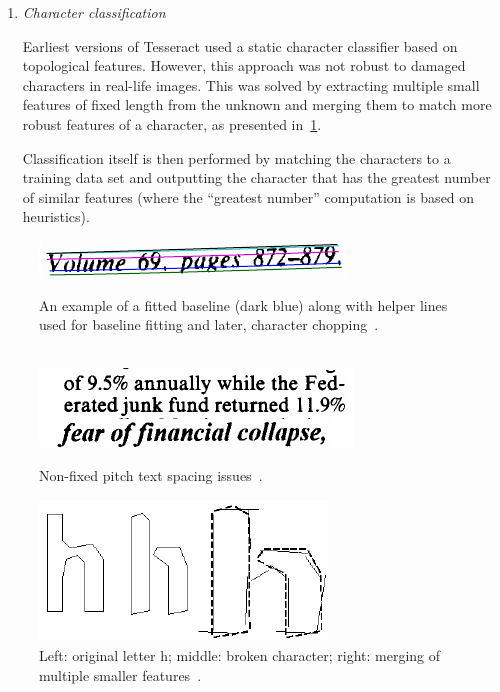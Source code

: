 \begin{enumerate}
    \item \emph{Character classification}
    
    Earliest versions of Tesseract used a static character classifier based on topological features. However, this approach was not robust to damaged characters in real-life images. This was solved by extracting multiple small features of fixed length from the unknown and merging them to match more robust features of a character, as presented in~\cref{fig:textRecTesseractChars}.
    
    Classification itself is then performed by matching the characters to a training data set and outputting the character that has the greatest number of similar features (where the ``greatest number'' computation is based on heuristics).
    
\end{enumerate}

\begin{figure}[t]
\minipage{\textwidth}
    \centering
    \includegraphics[width=0.7\linewidth]{img/textDetection/tesseractBaseline.png}
    \caption{An example of a fitted baseline (dark blue) along with helper lines used for baseline fitting and later, character chopping~\citep{smith2007overview}.}
    \label{fig:textRecTesseractBaseline}
\endminipage\\
    \includegraphics[width=\linewidth]{img/textDetection/tesseractSpacing.png}
    \caption{Non-fixed pitch text spacing issues~\citep{smith2007overview}.}
    \label{fig:textRecTesseractSpacing}
\endminipage\hfill
{}
    \includegraphics[width=\linewidth]{img/textDetection/tesseractCharacters.png}
    \caption{Left: original letter h; middle: broken character; right: merging of multiple smaller features~\citep{smith2007overview}.}
    \label{fig:textRecTesseractChars}
\endminipage
\end{figure}
